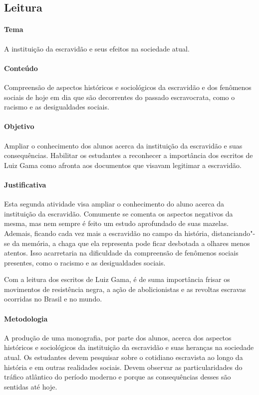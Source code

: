 \documentclass[12pt]{extarticle}
\begin{document}
\subsection{Leitura}


\paragraph{Tema} A instituição da escravidão e seus efeitos na sociedade atual.

\paragraph{Conteúdo} Compreensão de aspectos históricos e sociológicos
da escravidão e dos fenômenos sociais de hoje em dia que são decorrentes
do passado escravocrata, como o racismo e as desigualdades sociais.

\paragraph{Objetivo} Ampliar o conhecimento dos alunos acerca da instituição da 
escravidão e suas consequências. Habilitar os estudantes a reconhecer a importância 
dos escritos de Luiz Gama como afronta aos documentos que visavam legitimar a escravidão.

\paragraph{Justificativa} Esta segunda atividade visa ampliar o conhecimento do aluno
acerca da instituição da escravidão. Comumente se comenta os aspectos
negativos da mesma, mas nem sempre é feito um estudo aprofundado de suas
mazelas. Ademais, ficando cada vez mais a escravidão no campo da
história, distanciando"-se da memória, a chaga que ela representa pode
ficar desbotada a olhares menos atentos. Isso acarretaria na dificuldade
da compreensão de fenômenos sociais presentes, como o racismo e as
desigualdades sociais.

Com a leitura dos escritos de Luiz Gama, é de suma importância
frisar os movimentos de resistência negra, a ação de abolicionistas
e as revoltas escravas ocorridas no Brasil e no
mundo.

\paragraph{Metodologia} A produção de uma monografia, por parte dos alunos,
acerca dos aspectos históricos e sociológicos da instituição da escravidão
e suas heranças na sociedade atual. Os estudantes devem pesquisar sobre
o cotidiano escravista ao longo da história e em outras realidades sociais.
Devem observar as particularidades do tráfico atlântico do período moderno e porque as
consequências desses são sentidas até hoje. 
\end{document}
